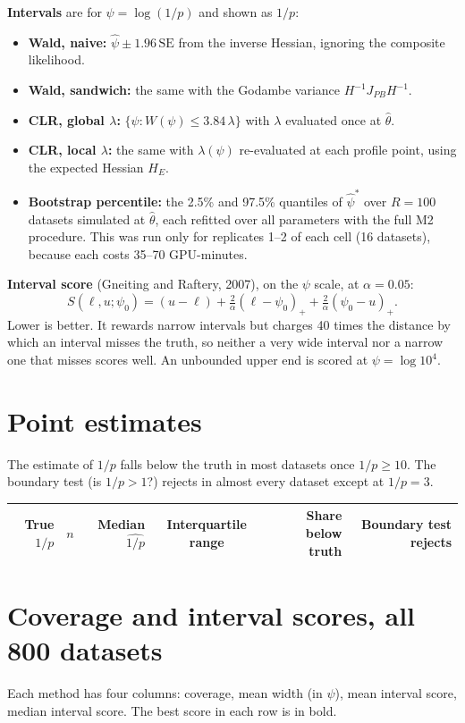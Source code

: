 \documentclass[11pt]{article}
\begin{document}
\textbf{Intervals} are for $\psi = \log(1/p)$ and shown as $1/p$:
\begin{itemize}
\item \textbf{Wald, naive:} $\hat\psi \pm 1.96\,\mathrm{SE}$ from the inverse Hessian, ignoring the composite likelihood.
\item \textbf{Wald, sandwich:} the same with the Godambe variance $H^{-1} J_{PB} H^{-1}$.
\item \textbf{CLR, global $\lambda$:} $\{\psi: W(\psi) \le 3.84\,\lambda\}$ with $\lambda$ evaluated once at $\hat\theta$.
\item \textbf{CLR, local $\lambda$:} the same with $\lambda(\psi)$ re-evaluated at each profile point, using the expected Hessian $H_E$.
\item \textbf{Bootstrap percentile:} the 2.5\% and 97.5\% quantiles of $\hat\psi^*$ over $R = 100$ datasets simulated at $\hat\theta$, each refitted over all parameters with the full M2 procedure. This was run only for replicates 1--2 of each cell (16 datasets), because each costs 35--70 GPU-minutes.
\end{itemize}

\textbf{Interval score} (Gneiting and Raftery, 2007), on the $\psi$ scale, at $\alpha = 0.05$:
\[ S(\ell, u; \psi_0) = (u - \ell) + \tfrac{2}{\alpha}(\ell - \psi_0)_+ + \tfrac{2}{\alpha}(\psi_0 - u)_+ . \]
Lower is better. It rewards narrow intervals but charges 40 times the distance by which an interval misses the truth, so neither a very wide interval nor a narrow one that misses scores well. An unbounded upper end is scored at $\psi = \log 10^4$.

\section{Point estimates}
The estimate of $1/p$ falls below the truth in most datasets once $1/p \ge 10$. The boundary test (is $1/p > 1$?) rejects in almost every dataset except at $1/p = 3$.

\begin{center}\small
\begin{tabular}{rrrcrr}
\toprule
True $1/p$ & $n$ & Median $\widehat{1/p}$ & Interquartile range & Share below truth & Boundary test rejects \\
\midrule
\bottomrule
\end{tabular}
\end{center}

\section{Coverage and interval scores, all 800 datasets}
Each method has four columns: coverage, mean width (in $\psi$), mean interval score, median interval score. The best score in each row is in bold.
\end{document}
